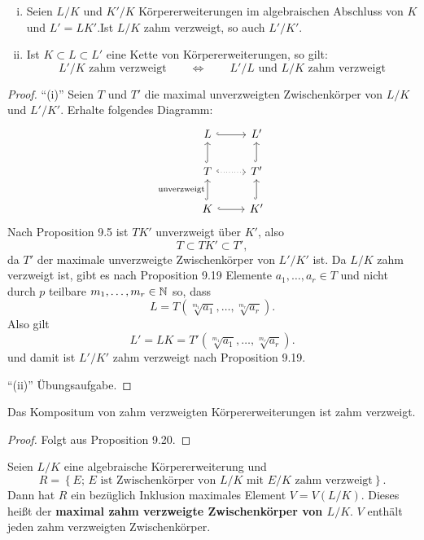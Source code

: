 

\begin{Prop}
	\begin{enumerate}[(i)]
		\item Seien $L/K$ und $K'/K$ Körpererweiterungen im algebraischen Abschluss von $K$ und $L'=LK'$.Ist $L/K$ zahm verzweigt, so auch $L'/K'$.
		\item Ist $K\subset L \subset L'$ eine Kette von Körpererweiterungen, so gilt:
		\[ L'/K \text{ zahm verzweigt} \qquad \Leftrightarrow \qquad L'/L \text{ und } L/K \text{ zahm verzweigt}
		\]
	\end{enumerate}
\end{Prop}

\begin{proof}
	\enquote{(i)} Seien $T$ und $T'$ die maximal unverzweigten Zwischenkörper von $L/K$ und $L'/K'$.
	Erhalte folgendes Diagramm:
	\[ \begin{tikzcd}
	L
	\arrow[hook]{r}
	& L'
	\\
	T
	\arrow[hook, dotted]{r}	
	\arrow[hook]{u}
	& T'
	\arrow[hook]{u}
	\\
	K
	\arrow[hook]{u}{\text{unverzweigt}}
	\arrow[hook]{r}
	& K'
	\arrow[hook]{u}
	\end{tikzcd}
	\]
	Nach Proposition 9.5 ist $TK'$ unverzweigt über $K'$, also
	\[ T \subset TK' \subset T',
	\]
	da $T'$ der maximale unverzweigte Zwischenkörper von $L'/K'$ ist.
	Da $L/K$ zahm verzweigt ist, gibt es nach Proposition 9.19 Elemente $a_1, \dots, a_r \in T$ und nicht durch $p$ teilbare $m_1, \dots, m_r \in \mathbb{N}$ so, dass
	\[ L = T \left( \sqrt[m_1]{a_1}, \dots, \sqrt[m_r]{a_r} \right).
	\]
	Also gilt 
	\[ L'=LK = T'\left( \sqrt[m_1]{a_1}, \dots, \sqrt[m_r]{a_r} \right).
	\]
	und damit ist $L'/K'$ zahm verzweigt nach Proposition 9.19.
	
	\bigskip \enquote{(ii)} Übungsaufgabe.
\end{proof}

\begin{Kor}
	Das Kompositum von zahm verzweigten Körpererweiterungen ist zahm verzweigt.
\end{Kor}


\begin{proof}
	Folgt aus Proposition 9.20.
\end{proof}

\begin{Bemdef}
	Seien $L/K$ eine algebraische Körpererweiterung und
	\[ R = \left\{ E; \, E \text{ ist Zwischenkörper von $L/K$ mit $E/K$ zahm verzweigt}  \right\}.
	\]
	Dann hat $R$ ein bezüglich Inklusion maximales Element $V=V(L/K)$. Dieses heißt der \textbf{maximal zahm verzweigte Zwischenkörper von $L/K$}. $V$ enthält jeden zahm verzweigten Zwischenkörper.
\end{Bemdef}


